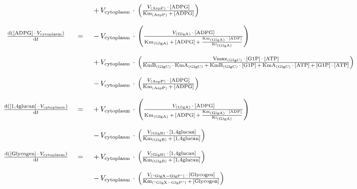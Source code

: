 $$\begin{array}{ccl}
 && \\ 
 \; && \;  { \, + \, {V}_{\mathrm{cytoplasm}} \, \cdot \, \left(\frac {{V}_{\mathrm{(AspP)}} \, \cdot \, {\mathrm{[ADPG]}} }  {{\mathrm{Km}}_{\mathrm{(AspP)}} \, + \, {\mathrm{[ADPG]}} } \right) } \\ 
 && \\ 
\frac {\mathrm{d}\left( {{\mathrm{[ADPG]}} \, \cdot \, {V}_{\mathrm{cytoplasm}} } \right) }  {\mathrm{d}{t} }  \; &=& \;  { \, - \, {V}_{\mathrm{cytoplasm}} \, \cdot \, \left(\frac {{V}_{\mathrm{(GlgA)}} \, \cdot \, {\mathrm{[ADPG]}} }  { {{\mathrm{Km}}_{\mathrm{(GlgA)}} \, + \, {\mathrm{[ADPG]}} }  \, + \, \frac {{\mathrm{Km}}_{\mathrm{(GlgA)}} \, \cdot \, {\mathrm{[ADP]}} } {{\mathrm{Ki}}_{\mathrm{(GlgA)}} } } \right) } \\ 
 && \\ 
 \; && \;  { \, + \, {V}_{\mathrm{cytoplasm}} \, \cdot \, \left(\frac { {{\mathrm{Vmax}}_{\mathrm{(GlgC)}} \, \cdot \, {\mathrm{[G1P]}} }  \, \cdot \, {\mathrm{[ATP]}} }  { { { {{\mathrm{KmB}}_{\mathrm{(GlgC)}} \, \cdot \, {\mathrm{KmA}}_{\mathrm{(GlgC)}} }  \, + \,  {{\mathrm{KmB}}_{\mathrm{(GlgC)}} \, \cdot \, {\mathrm{[G1P]}} }  }  \, + \,  {{\mathrm{KmA}}_{\mathrm{(GlgC)}} \, \cdot \, {\mathrm{[ATP]}} }  }  \, + \,  {{\mathrm{[G1P]}} \, \cdot \, {\mathrm{[ATP]}} }  } \right) } \\ 
 && \\ 
 \; && \;  { \, - \, {V}_{\mathrm{cytoplasm}} \, \cdot \, \left(\frac {{V}_{\mathrm{(AspP)}} \, \cdot \, {\mathrm{[ADPG]}} }  {{\mathrm{Km}}_{\mathrm{(AspP)}} \, + \, {\mathrm{[ADPG]}} } \right) } \\ 
 && \\ 
\frac {\mathrm{d}\left( {{\mathrm{[1,4glucan]}} \, \cdot \, {V}_{\mathrm{cytoplasm}} } \right) }  {\mathrm{d}{t} }  \; &=& \;  { \, + \, {V}_{\mathrm{cytoplasm}} \, \cdot \, \left(\frac {{V}_{\mathrm{(GlgA)}} \, \cdot \, {\mathrm{[ADPG]}} }  { {{\mathrm{Km}}_{\mathrm{(GlgA)}} \, + \, {\mathrm{[ADPG]}} }  \, + \, \frac {{\mathrm{Km}}_{\mathrm{(GlgA)}} \, \cdot \, {\mathrm{[ADP]}} } {{\mathrm{Ki}}_{\mathrm{(GlgA)}} } } \right) } \\ 
 && \\ 
 \; && \;  { \, - \, {V}_{\mathrm{cytoplasm}} \, \cdot \, \left(\frac {{V}_{\mathrm{(GlgB)}} \, \cdot \, {\mathrm{[1,4glucan]}} }  {{\mathrm{Km}}_{\mathrm{(GlgB)}} \, + \, {\mathrm{[1,4glucan]}} } \right) } \\ 
 && \\ 
\frac {\mathrm{d}\left( {{\mathrm{[Glycogen]}} \, \cdot \, {V}_{\mathrm{cytoplasm}} } \right) }  {\mathrm{d}{t} }  \; &=& \;  { \, + \, {V}_{\mathrm{cytoplasm}} \, \cdot \, \left(\frac {{V}_{\mathrm{(GlgB)}} \, \cdot \, {\mathrm{[1,4glucan]}} }  {{\mathrm{Km}}_{\mathrm{(GlgB)}} \, + \, {\mathrm{[1,4glucan]}} } \right) } \\ 
 && \\ 
 \; && \;  { \, - \, {V}_{\mathrm{cytoplasm}} \, \cdot \, \left(\frac {{V}_{\mathrm{("GlgX-GlgP")}} \, \cdot \, {\mathrm{[Glycogen]}} }  {{\mathrm{Km}}_{\mathrm{("GlgX-GlgP")}} \, + \, {\mathrm{[Glycogen]}} } \right) } \\ 
 && \\ 
\end{array}
$$